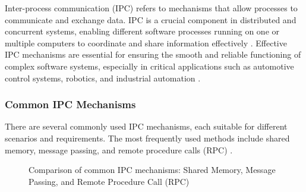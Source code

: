 Inter-process communication (IPC) refers to mechanisms that allow processes to communicate and exchange data. IPC is a crucial component in distributed and concurrent systems, enabling different software processes running on one or multiple computers to coordinate and share information effectively \cite{stallings2018}. Effective IPC mechanisms are essential for ensuring the smooth and reliable functioning of complex software systems, especially in critical applications such as automotive control systems, robotics, and industrial automation \cite{tanenbaum2015}.

\subsubsection{Common IPC Mechanisms}

There are several commonly used IPC mechanisms, each suitable for different scenarios and requirements. The most frequently used methods include shared memory, message passing, and remote procedure calls (RPC) \cite{stallings2018,tanenbaum2015}.

\begin{figure}[H]
	\centering
	\caption{Comparison of common IPC mechanisms: Shared Memory, Message Passing, and Remote Procedure Call (RPC)}
	\label{fig:ipc_methods}
\end{figure}


